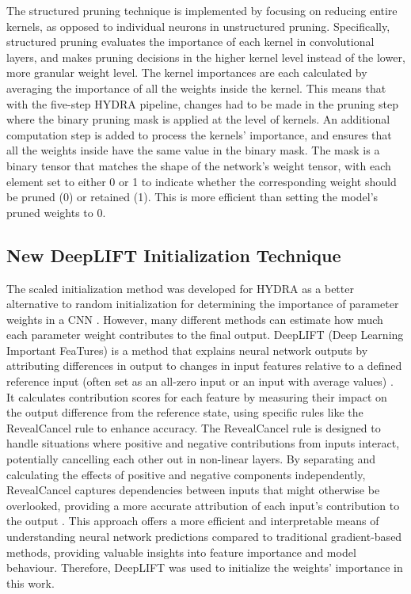 \documentclass[journal,onecolumn,12pt]{IEEEtran}
\begin{document}
The structured pruning technique is implemented by focusing on reducing entire kernels, as opposed to individual neurons in unstructured pruning. Specifically, structured pruning evaluates the importance of each kernel in convolutional layers, and makes pruning decisions in the higher kernel level instead of the lower, more granular weight level. The kernel importances are each calculated by averaging the importance of all the weights inside the kernel. This means that with the five-step HYDRA pipeline, changes had to be made in the pruning step where the binary pruning mask is applied at the level of kernels. An additional computation step is added to process the kernels' importance, and ensures that all the weights inside have the same value in the binary mask. The mask is a binary tensor that matches the shape of the network's weight tensor, with each element set to either 0 or 1 to indicate whether the corresponding weight should be pruned (0) or retained (1). This is more efficient than setting the model's pruned weights to 0.

\subsection{New DeepLIFT Initialization Technique}
The scaled initialization method was developed for HYDRA as a better alternative to random initialization for determining the importance of parameter weights in a CNN \cite{hydra}. However, many different methods can estimate how much each parameter weight contributes to the final output. DeepLIFT (Deep Learning Important FeaTures) is a method that explains neural network outputs by attributing differences in output to changes in input features relative to a defined reference input (often set as an all-zero input or an input with average values) \cite{deeplift}. It calculates contribution scores for each feature by measuring their impact on the output difference from the reference state, using specific rules like the RevealCancel rule to enhance accuracy. The RevealCancel rule is designed to handle situations where positive and negative contributions from inputs interact, potentially cancelling each other out in non-linear layers. By separating and calculating the effects of positive and negative components independently, RevealCancel captures dependencies between inputs that might otherwise be overlooked, providing a more accurate attribution of each input’s contribution to the output \cite{deeplift}. This approach offers a more efficient and interpretable means of understanding neural network predictions compared to traditional gradient-based methods, providing valuable insights into feature importance and model behaviour. Therefore, DeepLIFT was used to initialize the weights' importance in this work. 
\end{document}
